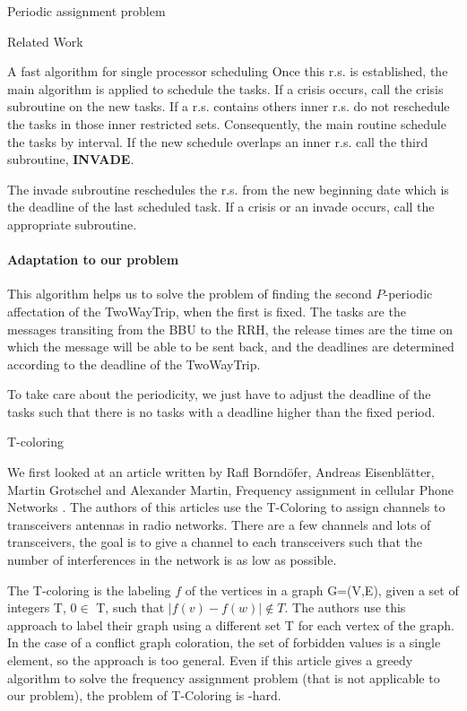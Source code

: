 \documentclass[a4paper,10pt]{report}
\begin{document}
\begin{chapter}{Periodic assignment problem}
\begin{section}{Related Work}
\begin{subsection}{A fast algorithm for single processor scheduling}
Once this r.s. is established, the main algorithm is applied to schedule the tasks. If a crisis occurs, call the crisis subroutine on the new tasks.
If a r.s. contains others inner r.s. do not reschedule the tasks in those inner restricted sets. Consequently, the main routine schedule 
the tasks by interval. If the new schedule overlaps an inner r.s. call the third subroutine, {\bf INVADE}.

The invade subroutine reschedules the r.s. from the new beginning date which is the deadline of the last scheduled task. If a crisis or an invade occurs,
call the appropriate subroutine.

\paragraph{Adaptation to our problem}
This algorithm helps us to solve the problem of finding the second $P$-periodic affectation of the TwoWayTrip, when the first is fixed. 
The tasks are the messages transiting from the BBU to the RRH, the release times are the time on which the message will be able to be sent back,
and the deadlines are determined according to the deadline of the TwoWayTrip.

To take care about the periodicity, we just have to adjust the deadline of the tasks such that there is no tasks with a deadline 
higher than the fixed period.

\end{subsection}


\begin{subsection}{T-coloring}


 We first looked at an article written by Rafl Borndöfer, Andreas Eisenblätter, Martin Grotschel and Alexander Martin, Frequency assignment
 in cellular Phone Networks \cite{borndorfer1998frequency}. The authors of this articles use the T-Coloring to assign channels to transceivers antennas in radio networks. There are a few channels and lots of transceivers, the goal is to give a channel to each transceivers
 such that the number of interferences in the network is as low as possible.
 
 The T-coloring is the labeling $f$ of the vertices in a graph G=(V,E), given a set of integers T, $0 \in$ T, such that 
 $|f(v) - f(w)| \notin T$.
 The authors use this approach to label their graph using a different set T for each vertex of the graph.
 In the case of a conflict graph coloration, the set of forbidden values is a single element, so the approach is too general.
 Even if this article gives a greedy algorithm to solve the frequency assignment problem (that is not applicable to our problem), the problem of T-Coloring is \NP-hard.


\end{subsection}
\end{section}
\end{chapter}
\end{document}
